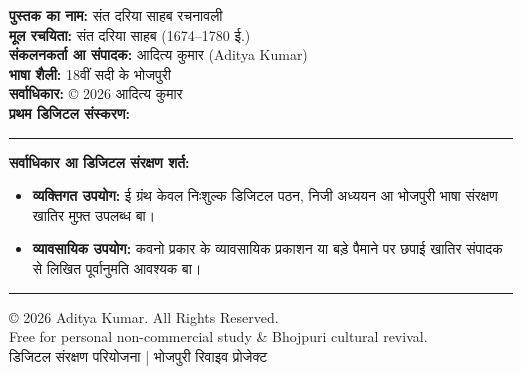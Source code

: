 \documentclass[12pt,a4paper,oneside]{article}
\begin{document}
\begin{center}
\begin{minipage}{0.88\textwidth}
  \small{}\setlength{\parskip}{0.7em}

  {\bfseries पुस्तक का नाम:} संत दरिया साहब रचनावली \\
  {\bfseries मूल रचयिता:} संत दरिया साहब {\engfont (1674--1780 ई.)} \\
  {\bfseries संकलनकर्ता आ संपादक:} आदित्य कुमार {\engfont (Aditya Kumar)} \\
  {\bfseries भाषा शैली:} 18वीं सदी के भोजपुरी \\
  {\bfseries सर्वाधिकार:} {\engfont \copyright} 2026 आदित्य कुमार \\
  {\bfseries प्रथम डिजिटल संस्करण:} {}

  \vspace*{1.0em}
  {\color{bordercolor}\rule{\textwidth}{0.4pt}}
  \vspace*{1.0em}

  {\bfseries सर्वाधिकार आ डिजिटल संरक्षण शर्त:}

  \begin{itemize}\setlength{\itemsep}{0.4em}
    \item {\bfseries व्यक्तिगत उपयोग:} ई ग्रंथ केवल निःशुल्क डिजिटल पठन, निजी अध्ययन आ भोजपुरी भाषा संरक्षण खातिर मुफ़्त उपलब्ध बा।
    \item {\bfseries व्यावसायिक उपयोग:} कवनो प्रकार के व्यावसायिक प्रकाशन या बड़े पैमाने पर छपाई खातिर संपादक से लिखित पूर्वानुमति आवश्यक बा।
  \end{itemize}

  \vspace*{0.8em}
  {\color{bordercolor}\rule{\textwidth}{0.4pt}}
  \vspace*{0.8em}

  \begin{center}
    {\engfont \copyright{} 2026 Aditya Kumar. All Rights Reserved.} \\
    {\small {\engfont Free for personal non-commercial study \& Bhojpuri cultural revival.}} \\
    \vspace*{0.5em}
    {\small डिजिटल संरक्षण परियोजना | भोजपुरी रिवाइव प्रोजेक्ट}
  \end{center}
\end{minipage}
\end{center}
\vfill

\newpage
\thispagestyle{empty}
\end{document}
